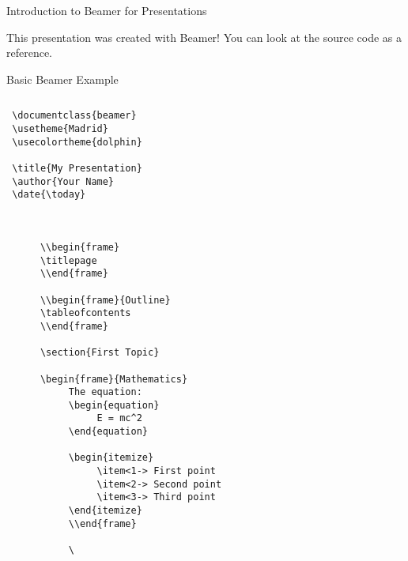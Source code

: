 \begin{frame}{Introduction to Beamer for Presentations}
          \begin{tip}
               This presentation was created with Beamer! You can look at the source code as a reference.
          \end{tip}
     \end{frame}
     
     \begin{frame}[fragile]{Basic Beamer Example}
          \begin{columns}
               \begin{column}{0.5\textwidth}
                    \begin{lstlisting}
 \documentclass{beamer}
 \usetheme{Madrid}
 \usecolortheme{dolphin}
 
 \title{My Presentation}
 \author{Your Name}
 \date{\today}
 
 
      
      \\begin{frame}
      \titlepage
      \\end{frame}
      
      \\begin{frame}{Outline}
      \tableofcontents
      \\end{frame}
      
      \section{First Topic}
      
      \begin{frame}{Mathematics}
           The equation:
           \begin{equation}
                E = mc^2
           \end{equation}
           
           \begin{itemize}
                \item<1-> First point
                \item<2-> Second point
                \item<3-> Third point
           \end{itemize}
           \\end{frame}
           
           \
                              \end{lstlisting}
                         \end{column}
                         

\end{columns}
\end{frame}
